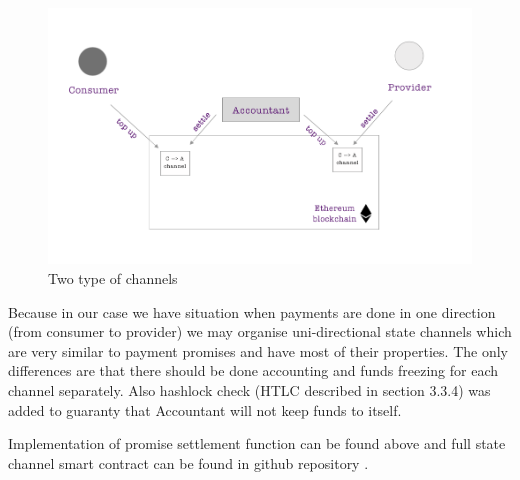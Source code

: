 \documentclass[a4paper,12pt]{article}
\begin{document}
\begin{figure}[H]
    \centering
    \includegraphics[scale=0.4]{img/accountant-channels}
    \caption{Two type of channels}
    \label{img:accountant-channels}
\end{figure}

Because in our case we have situation when payments are done in one direction 
(from consumer to provider) we may organise uni-directional state channels 
which are very similar to payment promises and have most of their properties. 
The only differences are that there should be done accounting and funds freezing 
for each channel separately. Also hashlock check (HTLC described in section 
3.3.4) was added to guaranty that Accountant will not keep funds to itself.

Implementation of promise settlement function can be found above and full 
state channel smart contract can be found in github repository 
\cite{smartcontracts}.
\end{document}
